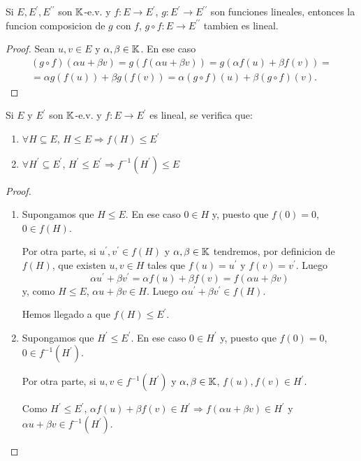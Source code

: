 \begin{proposition}
	Si \(E, E^\prime, E^{\prime \prime } \) son \(\mathbb{K}\)-e.v. y \(f \colon E \to E^\prime\), \(g \colon E^\prime \to E^{\prime\prime } \) son funciones lineales, entonces la funcion composicion de \(g \) con \(f \), \(g \circ f \colon E \to E^{\prime\prime }\) tambien es lineal.
\end{proposition}
\begin{proof}
	Sean \(u,v \in E \) y \(\alpha,\beta \in \mathbb{K} \). En ese caso
	\begin{multline*}
		(g \circ f)(\alpha u + \beta v) = g(f(\alpha u + \beta v)) = g(\alpha f(u) + \beta f(v)) = \\
		= \alpha g(f(u)) + \beta g(f(v)) = \alpha (g \circ  f)(u) + \beta (g \circ  f)(v).
	\end{multline*}
\end{proof}

\begin{proposition}
	Si \(E \) y \(E^\prime  \) son \(\mathbb{K} \)-e.v. y \(f \colon E \to E^\prime  \) es lineal, se verifica que:
	\begin{enumerate}
		\item \(\forall H \subseteq E \), \(H \leq E \Rightarrow f(H) \leq E^\prime \)
		\item \(\forall H^\prime \subseteq E^\prime \), \(H^\prime  \leq E^\prime \Rightarrow f^{-1} (H^\prime ) \leq E \)
	\end{enumerate}
\end{proposition}
\begin{proof}
	\begin{enumerate}
		\item Supongamos que \(H \leq E \). En ese caso \(0 \in H \) y, puesto que \(f(0) = 0 \), \(0 \in f(H )\).

		      Por otra parte, si \(u^\prime, v^\prime \in f(H )\) y \(\alpha,\beta \in \mathbb{K} \) tendremos, por definicion de \(f(H)\), que existen \(u,v \in H \) tales que \(f(u) = u^\prime \) y \(f(v) = v^\prime \). Luego
		      \[
			      \alpha u^\prime + \beta v^\prime = \alpha f(u) + \beta f(v) = f(\alpha u + \beta v)
		      \]
		      y, como \(H \leq E \), \(\alpha u + \beta v \in H \). Luego \(\alpha u^\prime + \beta v^\prime \in f(H )\).

		      Hemos llegado a que \(f(H) \leq E^\prime \).
		\item Supongamos que \(H^\prime \leq E^\prime \). En ese caso \(0 \in H^\prime \) y, puesto que \(f(0) = 0\), \(0 \in f^{-1} (H^\prime )\).

		      Por otra parte, si \(u,v \in f^{-1} (H^\prime )\) y \(\alpha,\beta \in \mathbb{K} \), \(f(u), f(v) \in H^\prime \).

		      Como \(H^\prime \leq E^\prime \), \(\alpha f(u) + \beta f(v) \in H^\prime \Rightarrow f(\alpha u + \beta v) \in H^\prime \) y \(\alpha u + \beta v \in f^{-1} (H^\prime )\).
	\end{enumerate}
\end{proof}

